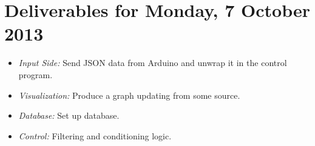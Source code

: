 \documentclass{article}
\begin{document}
\section{Deliverables for Monday, 7 October 2013}
\begin{itemize}
\item \emph{Input Side:} Send JSON data from Arduino and unwrap it in the
  control program.
\item \emph{Visualization:} Produce a graph updating from some source.
\item \emph{Database:} Set up database.
\item \emph{Control:} Filtering and conditioning logic.

\end{itemize}
\end{document}
